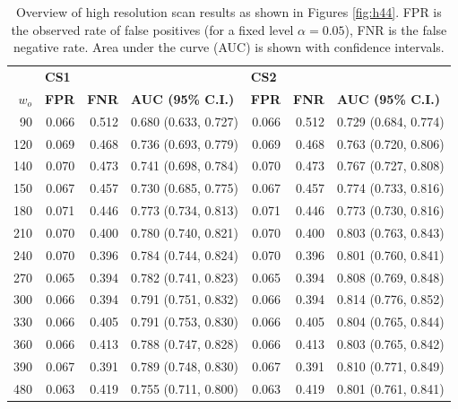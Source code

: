 \documentclass[12pt]{article}
\begin{document}
\begin{table}[hbtp]
\centering
\begin{adjustbox}{max width=\textwidth}
\begin{tabular}{rrrlrrl}
  \hline
  & \multicolumn{3}{l}{\bf CS1} & \multicolumn{3}{l}{\bf CS2} \\
$w_o$ & \bf FPR & \bf FNR & \bf AUC (95\% C.I.) & \bf FPR & \bf FNR & \bf AUC (95\% C.I.) \\  
  \hline
90 & 0.066 & 0.512 & 0.680 (0.633, 0.727) & 0.066 & 0.512 & 0.729 (0.684, 0.774) \\ 
  120 & 0.069 & 0.468 & 0.736 (0.693, 0.779) & 0.069 & 0.468 & 0.763 (0.720, 0.806) \\ 
  140 & 0.070 & 0.473 & 0.741 (0.698, 0.784) & 0.070 & 0.473 & 0.767 (0.727, 0.808) \\ 
  150 & 0.067 & 0.457 & 0.730 (0.685, 0.775) & 0.067 & 0.457 & 0.774 (0.733, 0.816) \\ 
  180 & 0.071 & 0.446 & 0.773 (0.734, 0.813) & 0.071 & 0.446 & 0.773 (0.730, 0.816) \\ 
  210 & 0.070 & 0.400 & 0.780 (0.740, 0.821) & 0.070 & 0.400 & 0.803 (0.763, 0.843) \\ 
  240 & 0.070 & 0.396 & 0.784 (0.744, 0.824) & 0.070 & 0.396 & 0.801 (0.760, 0.841) \\ 
  270 & 0.065 & 0.394 & 0.782 (0.741, 0.823) & 0.065 & 0.394 & 0.808 (0.769, 0.848) \\ 
  300 & 0.066 & 0.394 & 0.791 (0.751, 0.832) & 0.066 & 0.394 & 0.814 (0.776, 0.852) \\ 
  330 & 0.066 & 0.405 & 0.791 (0.753, 0.830) & 0.066 & 0.405 & 0.804 (0.765, 0.844) \\ 
  360 & 0.066 & 0.413 & 0.788 (0.747, 0.828) & 0.066 & 0.413 & 0.803 (0.765, 0.842) \\ 
  390 & 0.067 & 0.391 & 0.789 (0.748, 0.830) & 0.067 & 0.391 & 0.810 (0.771, 0.849) \\ 
  480 & 0.063 & 0.419 & 0.755 (0.711, 0.800) & 0.063 & 0.419 & 0.801 (0.761, 0.841) \\ 
   \hline
\end{tabular}
\end{adjustbox}
\caption{\label{tab:aucsh44} Overview of high resolution scan results as shown in Figures \ref{fig:h44}. FPR is the observed rate of false positives (for a fixed level $\alpha = 0.05$), FNR is the false negative rate. Area under the curve (AUC) is shown with confidence intervals. }
\end{table}
\end{document}
